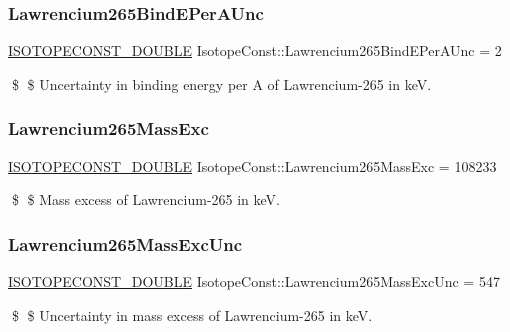 \subsubsection{\texorpdfstring{Lawrencium265\+Bind\+E\+Per\+A\+Unc}{Lawrencium265BindEPerAUnc}}
{\footnotesize\ttfamily \mbox{\hyperlink{group___isotope_const-_macros_ga8f45a7272ce02c0b4c65c44636ed719a}{I\+S\+O\+T\+O\+P\+E\+C\+O\+N\+S\+T\+\_\+\+D\+O\+U\+B\+LE}} Isotope\+Const\+::\+Lawrencium265\+Bind\+E\+Per\+A\+Unc = 2}

\$ \$ Uncertainty in binding energy per A of Lawrencium-\/265 in keV. \mbox{\label{group___isotope_const-_lawrencium-_lr265_ga28b8d5a051bb298782e979d97a0238e6}} 
\subsubsection{\texorpdfstring{Lawrencium265\+Mass\+Exc}{Lawrencium265MassExc}}
{\footnotesize\ttfamily \mbox{\hyperlink{group___isotope_const-_macros_ga8f45a7272ce02c0b4c65c44636ed719a}{I\+S\+O\+T\+O\+P\+E\+C\+O\+N\+S\+T\+\_\+\+D\+O\+U\+B\+LE}} Isotope\+Const\+::\+Lawrencium265\+Mass\+Exc = 108233}

\$ \$ Mass excess of Lawrencium-\/265 in keV. \mbox{\label{group___isotope_const-_lawrencium-_lr265_ga8f0855ed3660fc85ca0fa445d015874a}} 
\subsubsection{\texorpdfstring{Lawrencium265\+Mass\+Exc\+Unc}{Lawrencium265MassExcUnc}}
{\footnotesize\ttfamily \mbox{\hyperlink{group___isotope_const-_macros_ga8f45a7272ce02c0b4c65c44636ed719a}{I\+S\+O\+T\+O\+P\+E\+C\+O\+N\+S\+T\+\_\+\+D\+O\+U\+B\+LE}} Isotope\+Const\+::\+Lawrencium265\+Mass\+Exc\+Unc = 547}

\$ \$ Uncertainty in mass excess of Lawrencium-\/265 in keV. \mbox{\label{group___isotope_const-_lawrencium-_lr265_ga70e44ef0497312ba5bf6963afc361ac6}} 
